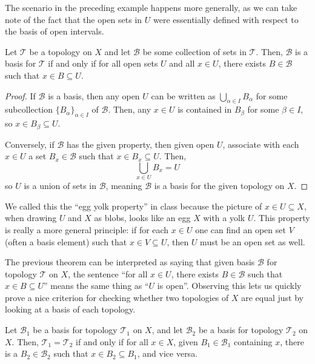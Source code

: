 \documentclass[11pt]{scrartcl}
\begin{document}
The scenario in the preceding example happens more generally,
as we can take note of the fact that the open sets in $U$ were
essentially defined with respect to the basis of open intervals.
\begin{theorem}
    \label{thm:basiscriterion}
    Let $\mathcal T$ be a topology on $X$ and
    let $\mathcal B$ be some collection of sets in $\mathcal T$.
    Then, $\mathcal B$ is a basis for $\mathcal T$ if and only if
    for all open sets $U$ and all $x\in U$, there exists $B\in\mathcal B$
    such that $x\in B\subseteq U$.
\end{theorem}

\begin{proof}
    If $\mathcal B$ is a basis, then any open $U$ can be written as
    $\bigcup_{\alpha\in I}B_\alpha$ for some
    subcollection $\{B_\alpha\}_{\alpha\in I}$ of $\mathcal B$.
    Then, any $x\in U$ is contained in $B_\beta$ for some $\beta\in I$,
    so $x\in B_\beta\subseteq U$.

    Conversely, if $\mathcal B$ has the given property,
    then given open $U$, associate with each $x\in U$ a set $B_x\in\mathcal B$
    such that $x\in B_x\subseteq U$. Then,
    \begin{equation*}
	\bigcup_{x\in U}B_x = U
    \end{equation*}
    so $U$ is a union of sets in $\mathcal B$, meaning $\mathcal B$ is a basis
    for the given topology on $X$.
\end{proof}

\begin{remark}
    We called this the ``egg yolk property'' in class because
    the picture of $x\in U\subseteq X$, when drawing $U$ and $X$ as blobs,
    looks like an egg $X$ with a yolk $U$.
    This property is really a more general principle:
    if for each $x\in U$ one can find an open set $V$
    (often a basis element) such that $x\in V\subseteq U$,
    then $U$ must be an open set as well.
\end{remark}

The previous theorem can be interpreted as saying that
given basis $\mathcal B$ for topology $\mathcal T$ on $X$,
the sentence ``for all $x\in U$, there exists $B\in\mathcal B$ such that
$x\in B\subseteq U$'' means the same thing as ``$U$ is open''.
Observing this lets us quickly prove a nice criterion
for checking whether two topologies of $X$ are equal
just by looking at a basis of each topology.
\begin{theorem}
    \label{thm:sametopologyfrombases}
    Let $\mathcal B_1$ be a basis for topology $\mathcal T_1$ on $X$, and
    let $\mathcal B_2$ be a basis for topology $\mathcal T_2$ on $X$.
    Then, $\mathcal T_1=\mathcal T_2$ if and only if for all $x\in X$,
    given $B_1\in\mathcal B_1$ containing $x$, there is a $B_2\in\mathcal B_2$
    such that $x\in B_2\subseteq B_1$, and vice versa.
\end{theorem}
\end{document}
